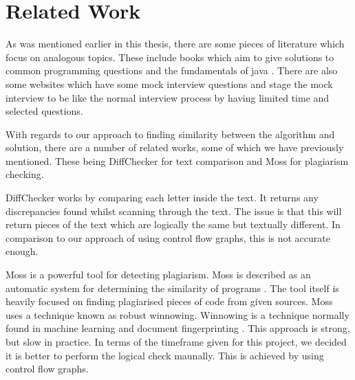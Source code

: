 \documentclass[10pt,twocolumn,hidelinks]{IEEEtran}
\begin{document}
\section{Related Work}
As was mentioned earlier in this thesis, there are some pieces of literature which focus on analogous topics. These include books which aim to give solutions to common programming questions \cite{mcdowell2015cracking} and the fundamentals of java \cite{markham2014java}\cite{aziz2012elements}. There are also some websites which have some mock interview questions and stage the mock interview to be like the normal interview process by having limited time and selected questions.
\par With regards to our approach to finding similarity between the algorithm and solution, there are a number of related works, some of which we have previously mentioned. These being DiffChecker for text comparison and Moss for plagiarism checking. 
\par DiffChecker works by comparing each letter inside the text. It returns any discrepancies found whilst scanning through the text. The issue is that this will return pieces of the text which are logically the same but textually different. In comparison to our approach of using control flow graphs, this is not accurate enough. 
\par Moss is a powerful tool for detecting plagiarism. Moss is described as an automatic system for determining the similarity of programs \cite{mosswebsite}. The tool itself is heavily focused on finding plagiarised pieces of code from given sources. Moss uses a technique known as robust winnowing. Winnowing is a technique normally found in machine learning and document fingerprinting \cite{Schleimer:2003:WLA:872757.872770}. This approach is strong, but slow in practice. In terms of the timeframe given for this project, we decided it is better to perform the logical check maunally. This is achieved by using control flow graphs.
\end{document}
